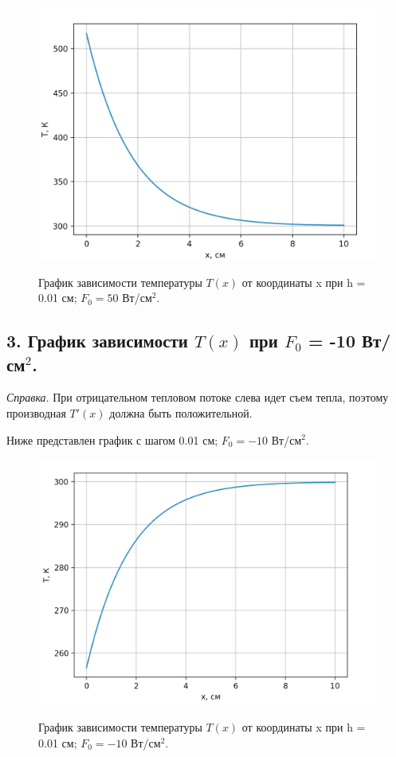 \documentclass[a4paper,12pt]{article}
\begin{document}
	\begin{figure}[h!]
		\begin{center}
			{\includegraphics[scale = 0.4]{0.01.png}}
			\label{ris:0.01}
		\end{center}
		\caption{График зависимости температуры $T(x)$ от координаты x при h = 0.01 см; $F_0 = 50$ Вт/см$^2$.}
	\end{figure}

	
	\subsection*{3. График зависимости $T(x)$ при $F_0$ = -10 Вт/см$^2$. }
	
	\begin{center}
		\textit{Справка}. При отрицательном тепловом потоке слева идет съем тепла, поэтому
		производная $T'(x)$ должна быть положительной.
	\end{center}

	Ниже представлен график с шагом 0.01 см; $F_0 = -10$ Вт/см$^2$.

	\begin{figure}[h!]
		\begin{center}
			{\includegraphics[scale = 0.4]{-10.png}}
			\label{ris:-10}
		\end{center}
		\caption{График зависимости температуры $T(x)$ от координаты x при h = 0.01 см; $F_0 = -10$ Вт/см$^2$.}
	\end{figure}
	
\end{document}
